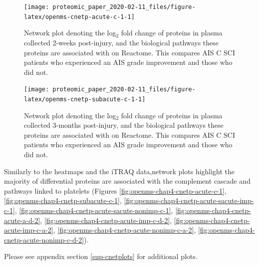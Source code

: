 \documentclass[9pt,lineno]{elife}
\begin{document}
\begin{landscape}



\begin{figure}

{\centering \texttt{[image: proteomic\_paper\_2020-02-11\_files/figure-latex/openms-cnetp-acute-c-1-1]} 

}

\caption{Network plot denoting the log\(_2\) fold change of proteins in plasma collected 2-weeks post-injury, and the biological pathways these proteins are associated with on Reactome. This compares AIS C SCI patients who experienced an AIS grade improvement and those who did not.}\label{fig:openms-cnetp-acute-c-1}
\end{figure}

\end{landscape}
\begin{landscape}



\begin{figure}

{\centering \texttt{[image: proteomic\_paper\_2020-02-11\_files/figure-latex/openms-cnetp-subacute-c-1-1]} 

}

\caption{Network plot denoting the log\(_2\) fold change of proteins in plasma collected 3-months post-injury, and the biological pathways these proteins are associated with on Reactome. This compares AIS C SCI patients who experienced an AIS grade improvement and those who did not.}\label{fig:openms-cnetp-subacute-c-1}
\end{figure}

\end{landscape}

\clearpage

Similarly to the heatmaps and the iTRAQ data,network plots highlight the majority of differential proteins are associated with the complement cascade and pathways linked to platelets (Figures \ref{fig:openms-chap4-cnetp-acute-c-1}, \ref{fig:openms-chap4-cnetp-subacute-c-1}, \ref{fig:openms-chap4-cnetp-acute-sacute-imp-c-1}, \ref{fig:openms-chap4-cnetp-acute-sacute-nonimp-c-1}, \ref{fig:openms-chap4-cnetp-acute-a-d-2}, \ref{fig:openms-chap4-cnetp-acute-imp-c-d-2}, \ref{fig:openms-chap4-cnetp-acute-imp-c-a-2}, \ref{fig:openms-chap4-cnetp-acute-nonimp-c-a-2}, \ref{fig:openms-chap4-cnetp-acute-nonimp-c-d-2}).

Please see appendix section \ref{sup-cnetplots} for additional plots.
\end{document}

